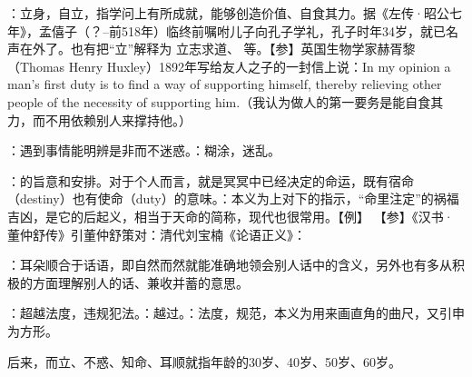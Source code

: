 {
\begin{lyitemize}
\item {}：立身，自立，指学问上有所成就，能够创造价值、自食其力。据《左传·昭公七年》，孟僖子（？--前518年）临终前嘱咐儿子向孔子学礼，孔子时年34岁，就已名声在外了。也有把“立”解释为  立志求道、 等。【参】英国生物学家赫胥黎（Thomas Henry Huxley）1892年写给友人之子的一封信上说：In my opinion a man's first duty is to find a way of supporting himself, thereby relieving other people of the necessity of supporting him.（我认为做人的第一要务是能自食其力，而不用依赖别人来撑持他。）
\item {}：遇到事情能明辨是非而不迷惑。：糊涂，迷乱。

\item {}：的旨意和安排。对于个人而言，就是冥冥中已经决定的命运，既有宿命（destiny）也有使命（duty）的意味。：本义为上对下的指示，“命里注定”的祸福吉凶，是它的后起义，相当于天命的简称，现代也很常用。【例】 【参】《汉书·董仲舒传》引董仲舒策对：清代刘宝楠《论语正义》：
\item {}：耳朵顺合于话语，即自然而然就能准确地领会别人话中的含义，另外也有多从积极的方面理解别人的话、兼收并蓄的意思。
\item {}：超越法度，违规犯法。：越过。：法度，规范，本义为用来画直角的曲尺，又引申为方形。
\end{lyitemize}
后来，而立、不惑、知命、耳顺就指年龄的30岁、40岁、50岁、60岁。
}
{} %


